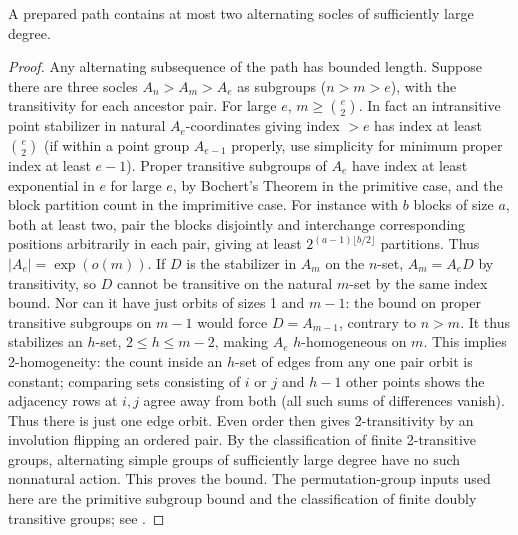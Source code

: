 \begin{lemma}\label{w:alternating-switch}
A prepared path contains at most two alternating socles of sufficiently large degree.
\end{lemma}
\begin{proof}
Any alternating subsequence of the path has bounded length. Suppose there are three socles \(A_n>A_m>A_e\) as subgroups (\(n>m>e\)), with the transitivity for each ancestor pair. For large \(e\), \(m\ge\binom e2\). In fact an intransitive point stabilizer in natural \(A_e\)-coordinates giving index \(>e\) has index at least \(\binom e2\) (if within a point group \(A_{e-1}\) properly, use simplicity for minimum proper index at least \(e-1\)). Proper transitive subgroups of \(A_e\) have index at least exponential in \(e\) for large \(e\), by Bochert's Theorem in the primitive case, and the block partition count in the imprimitive case. For instance with \(b\) blocks of size \(a\), both at least two, pair the blocks disjointly and interchange corresponding positions arbitrarily in each pair, giving at least \(2^{(a-1)\lfloor b/2\rfloor}\) partitions. Thus \(|A_e|=\exp(o(m))\). If \(D\) is the stabilizer in \(A_m\) on the \(n\)-set, \(A_m=A_eD\) by transitivity, so \(D\) cannot be transitive on the natural \(m\)-set by the same index bound. Nor can it have just orbits of sizes 1 and \(m-1\): the bound on proper transitive subgroups on \(m-1\) would force \(D=A_{m-1}\), contrary to \(n>m\). It thus stabilizes an \(h\)-set, \(2\le h\le m-2\), making \(A_e\) \(h\)-homogeneous on \(m\). This implies 2-homogeneity: the count inside an \(h\)-set of edges from any one pair orbit is constant; comparing sets consisting of \(i\) or \(j\) and \(h-1\) other points shows the adjacency rows at \(i,j\) agree away from both (all such sums of differences vanish). Thus there is just one edge orbit. Even order then gives 2-transitivity by an involution flipping an ordered pair. By the classification of finite 2-transitive groups, alternating simple groups of sufficiently large degree have no such nonnatural action. This proves the bound. The permutation-group inputs used here are the primitive subgroup bound and the classification of finite doubly transitive groups; see \citet{DixonMortimer1996}.
\end{proof}

